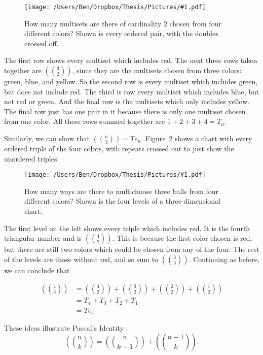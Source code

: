 \documentclass[12pt]{scrippsthesis}
\newcommand{\pic}[2]{\texttt{[image: /Users/Ben/Dropbox/Thesis/Pictures/\#1.pdf]}}
\newcommand{\mchoose}[2]{{\textstyle \left( \! {#1 \choose #2} \! \right)}}
\theoremstyle{definition}
\theoremstyle{remark}
\theoremstyle{plain}
\begin{document}
	\begin{figure}[H]
	\centerline{
	\pic{4mchoose2}{width=2in}}
	\caption{How many multisets are there of cardinality 2 chosen from four different colors?  Shown is every ordered pair, with the doubles crossed off.}
	\label{fig:4mchoose2}
	\end{figure}

The first row shows every multiset which includes red.  The next three rows taken together are $\mchoose{3}{2}$, since they are the multisets chosen from three colors: green, blue, and yellow.  So the second row is every multiset which includes green, but does not include red.  The third is row every multiset which includes blue, but not red or green.  And the final row is the multisets which only includes yellow.  The final row just has one pair in it because there is only one multiset chosen from one color.  All these rows summed together are $1+2+3+4=T_n$.

Similarly, we can show that $\mchoose{n}{3}=Te_n$.  Figure~\ref{fig:4mchoose3} shows a chart with every ordered triple of the four colors, with repeats crossed out to just show the unordered triples.

	\begin{figure}[H]
	\centerline{
	\pic{4mchoose3}{width=5.5in}}
	\caption{How many ways are there to multichoose three balls from four different colors?  Shown is the four levels of a three-dimensional chart. }
	\label{fig:4mchoose3}
	\end{figure}

The first level on the left shows every triple which includes red.  It is the fourth triangular number and is $\mchoose{4}{2}$.  This is because the first color chosen is red, but there are still two colors which could be chosen from any of the four.  The rest of the levels are those without red, and so sum to $\mchoose{3}{3}$.  Continuing as before, we can conclude that 

\begin{equation}\begin{split}
	\mchoose{4}{3} &= \mchoose{4}{2}+\mchoose{3}{2}+\mchoose{2}{2}+\mchoose{1}{2}\\
	&=T_4+T_3+T_2+T_1\\
	&=Te_4
\end{split}\end{equation}

These ideas illustrate Pascal's Identity \cite{Pixley}:
\begin{equation}
\mchoose{n}{k} = \mchoose{n}{k-1} + \mchoose{n-1}{k}.
\end{equation}
\end{document}

